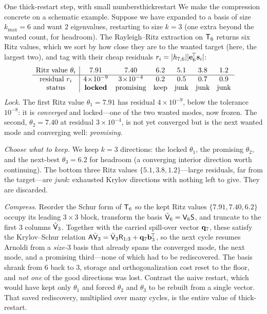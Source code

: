 \begin{workedexample}{One thick-restart step, with small numbers}{thickrestart}
We make the compression concrete on a schematic example. Suppose we have expanded to a basis of
size $k_{\max} = 6$ and want $2$ eigenvalues, restarting to size $k = 3$ (one extra beyond the
wanted count, for headroom). The Rayleigh--Ritz extraction on $\mathsf{T}_6$ returns six Ritz values,
which we sort by how close they are to the wanted target (here, the largest two), and tag with
their cheap residuals $r_i = \lvert h_{7,6}\rvert\lvert\mathbf{e}_6^{\!\top}\mathbf{s}_i\rvert$:
\[
  \begin{array}{c|cccccc}
    \text{Ritz value } \theta_i & 7.91 & 7.40 & 6.2 & 5.1 & 3.8 & 1.2 \\\hline
    \text{residual } r_i & 4\!\times\!10^{-9} & 3\!\times\!10^{-4} & 0.2 & 0.5 & 0.7 & 0.9 \\
    \text{status} & \text{\textbf{locked}} & \text{promising} & \text{keep} & \text{junk} & \text{junk} & \text{junk}
  \end{array}
\]
\emph{Lock.} The first Ritz value $\theta_1 = 7.91$ has residual $4\times10^{-9}$, below the
tolerance $10^{-8}$: it is \emph{converged} and locked---one of the two wanted modes, now frozen.
The second, $\theta_2 = 7.40$ at residual $3\times10^{-4}$, is not yet converged but is the next
wanted mode and converging well: \emph{promising}.

\smallskip
\emph{Choose what to keep.} We keep $k = 3$ directions: the locked $\theta_1$, the promising
$\theta_2$, and the next-best $\theta_3 = 6.2$ for headroom (a converging interior direction worth
continuing). The bottom three Ritz values $\{5.1, 3.8, 1.2\}$---large residuals, far from the
target---are \emph{junk}: exhausted Krylov directions with nothing left to give. They are discarded.

\smallskip
\emph{Compress.} Reorder the Schur form of $\mathsf{T}_6$ so the kept Ritz values
$\{7.91, 7.40, 6.2\}$ occupy its leading $3\times3$ block, transform the basis
$\tilde{\mathsf{V}}_6 = \mathsf{V}_6\mathsf{S}$, and truncate to the first $3$ columns
$\tilde{\mathsf{V}}_3$. Together with the carried spill-over vector $\mathbf{q}_7$, these satisfy the
Krylov--Schur relation $\mathsf{A}\tilde{\mathsf{V}}_3 = \tilde{\mathsf{V}}_3\mathsf{R}_{1:3} +
\mathbf{q}_7\mathbf{b}_3^{\!\top}$, so the next cycle resumes Arnoldi from a \emph{size-$3$} basis that already
spans the converged mode, the next mode, and a promising third---none of which had to be
rediscovered. The basis shrank from $6$ back to $3$, storage and orthogonalization cost reset to
the floor, and \emph{not one} of the good directions was lost. Contrast the naive restart, which
would have kept only $\theta_1$ and forced $\theta_2$ and $\theta_3$ to be rebuilt from a single
vector. That saved rediscovery, multiplied over many cycles, is the entire value of
thick-restart.
\end{workedexample}

